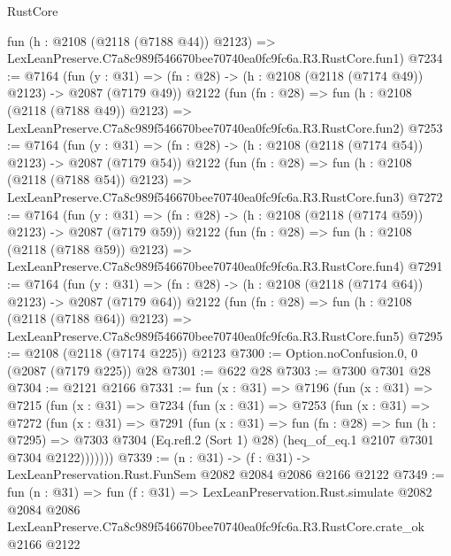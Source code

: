 \begin{lexlean}{RustCore}
\begin{coremodule}
    fun (h : @2108 (@2118 (@7188 @44)) @2123) =>
    LexLeanPreserve.C7a8c989f546670bee70740ea0fc9fc6a.R3.RustCore.fun1)
@7234 := @7164
    (fun (y : @31) => (fn : @28) -> (h : @2108 (@2118 (@7174 @49)) @2123) -> @2087 (@7179 @49))
    @2122
    (fun (fn : @28) =>
    fun (h : @2108 (@2118 (@7188 @49)) @2123) =>
    LexLeanPreserve.C7a8c989f546670bee70740ea0fc9fc6a.R3.RustCore.fun2)
@7253 := @7164
    (fun (y : @31) => (fn : @28) -> (h : @2108 (@2118 (@7174 @54)) @2123) -> @2087 (@7179 @54))
    @2122
    (fun (fn : @28) =>
    fun (h : @2108 (@2118 (@7188 @54)) @2123) =>
    LexLeanPreserve.C7a8c989f546670bee70740ea0fc9fc6a.R3.RustCore.fun3)
@7272 := @7164
    (fun (y : @31) => (fn : @28) -> (h : @2108 (@2118 (@7174 @59)) @2123) -> @2087 (@7179 @59))
    @2122
    (fun (fn : @28) =>
    fun (h : @2108 (@2118 (@7188 @59)) @2123) =>
    LexLeanPreserve.C7a8c989f546670bee70740ea0fc9fc6a.R3.RustCore.fun4)
@7291 := @7164
    (fun (y : @31) => (fn : @28) -> (h : @2108 (@2118 (@7174 @64)) @2123) -> @2087 (@7179 @64))
    @2122
    (fun (fn : @28) =>
    fun (h : @2108 (@2118 (@7188 @64)) @2123) =>
    LexLeanPreserve.C7a8c989f546670bee70740ea0fc9fc6a.R3.RustCore.fun5)
@7295 := @2108 (@2118 (@7174 @225)) @2123
@7300 := Option.noConfusion.{0, 0} (@2087 (@7179 @225)) @28
@7301 := @622 @28
@7303 := @7300 @7301 @28
@7304 := @2121 @2166
@7331 := fun (x : @31) =>
  @7196
    (fun (x : @31) =>
    @7215
      (fun (x : @31) =>
      @7234
        (fun (x : @31) =>
        @7253
          (fun (x : @31) =>
          @7272
            (fun (x : @31) =>
            @7291
              (fun (x : @31) =>
              fun (fn : @28) =>
              fun (h : @7295) =>
              @7303 @7304 (Eq.refl.{2} (Sort 1) @28) (heq_of_eq.{1} @2107 @7301 @7304 @2122)))))))
@7339 := (n : @31) -> (f : @31) -> LexLeanPreservation.Rust.FunSem @2082 @2084 @2086 @2166 @2122
@7349 := fun (n : @31) =>
  fun (f : @31) =>
  LexLeanPreservation.Rust.simulate
    @2082
    @2084
    @2086
    LexLeanPreserve.C7a8c989f546670bee70740ea0fc9fc6a.R3.RustCore.crate_ok
    @2166
    @2122
\end{coremodule}
\end{lexlean}
